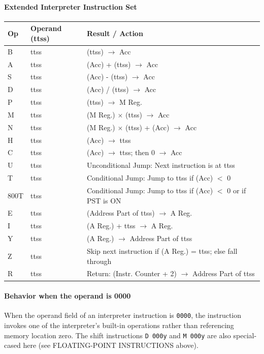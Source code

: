 \paragraph{Extended Interpreter Instruction Set}

\begin{table}[h]
\centering
\small
\ttfamily
\begin{tabularx}{\textwidth}{llX}
\toprule
\textbf{Op} & \textbf{Operand (ttss)} & \textbf{Result / Action} \\ 
\midrule
B & ttss & (ttss) $\rightarrow$ Acc \\
A & ttss & (Acc) + (ttss) $\rightarrow$ Acc \\
S & ttss & (Acc) - (ttss) $\rightarrow$ Acc \\
D & ttss & (Acc) / (ttss) $\rightarrow$ Acc \\
P & ttss & (ttss) $\rightarrow$ M Reg. \\
M & ttss & (M Reg.) $\times$ (ttss) $\rightarrow$ Acc \\
N & ttss & (M Reg.) $\times$ (ttss) + (Acc) $\rightarrow$ Acc \\
H & ttss & (Acc) $\rightarrow$ ttss \\
C & ttss & (Acc) $\rightarrow$ ttss; then 0 $\rightarrow$ Acc \\
U & ttss & Unconditional Jump: Next instruction is at ttss \\
T    & ttss & Conditional Jump: Jump to ttss if (Acc) $<$ 0 \\
800T & ttss & Conditional Jump: Jump to ttss if (Acc) $<$ 0 or if \textsf{PST} is \textsf{ON} \\
E & ttss & (Address Part of ttss) $\rightarrow$ A Reg. \\
I & ttss & (A Reg.) + ttss $\rightarrow$ A Reg. \\
Y & ttss & (A Reg.) $\rightarrow$ Address Part of ttss \\
Z & ttss & Skip next instruction if (A Reg.) = ttss; else fall through \\
R & ttss & Return: (Instr. Counter + 2) $\rightarrow$ Address Part of ttss \\
\bottomrule
\end{tabularx}
\end{table}
\newpage
\paragraph{Behavior when the operand is 0000}
When the operand field of an interpreter instruction is \texttt{0000}, the instruction invokes one of the interpreter's built-in operations rather than referencing memory location zero. The shift instructions \texttt{D 000y} and \texttt{M 000y} are also special-cased here (see FLOATING-POINT INSTRUCTIONS above).


